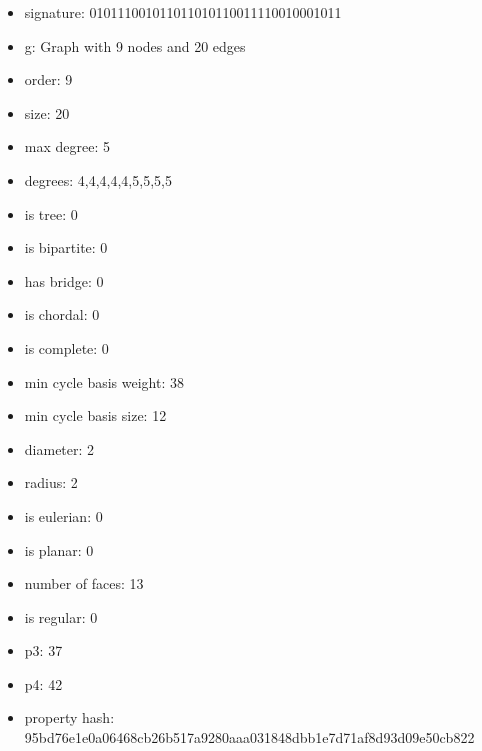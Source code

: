 \newpage
\begin{figure}
\end{figure}
\begin{itemize}
\item signature: 010111001011011010110011110010001011
\item g: Graph with 9 nodes and 20 edges
\item order: 9
\item size: 20
\item max degree: 5
\item degrees: 4,4,4,4,4,5,5,5,5
\item is tree: 0
\item is bipartite: 0
\item has bridge: 0
\item is chordal: 0
\item is complete: 0
\item min cycle basis weight: 38
\item min cycle basis size: 12
\item diameter: 2
\item radius: 2
\item is eulerian: 0
\item is planar: 0
\item number of faces: 13
\item is regular: 0
\item p3: 37
\item p4: 42
\item property hash: 95bd76e1e0a06468cb26b517a9280aaa031848dbb1e7d71af8d93d09e50cb822
\end{itemize}

